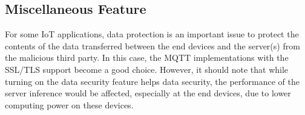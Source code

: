 \documentclass[format=acmsmall, review=false, screen=true]{acmart}
\begin{document}
\subsection{Miscellaneous Feature}
For some IoT applications, data protection is an important issue to protect the contents of the data transferred between the end devices and the server(s) from the malicious third party. In this case, the MQTT implementations with the SSL/TLS support become a good choice. However, it should note that while turning on the data security feature helps data security, the performance of the server inference would be affected, especially at the end devices, due to lower computing power on these devices.


%
%
%
%
\end{document}
